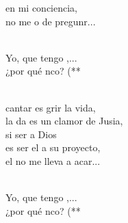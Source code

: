 \begin{cancion}
en mi conciencia, \\
	no me o de pregunr...\\\jump\\
	\begin{chorus}%
	Yo, que tengo ,...  \\
	¿por qué nco? (** \\
	\end{chorus}%
	\jump\\
	cantar es grir la vida,\\
	la da es un clamor de Jusia,\\
	si ser a Dios \\
	es ser el a su proyecto,\\
	el no me lleva a acar...\\\jump\\
	\begin{chorus}%
	Yo, que tengo ,...  \\
	¿por qué nco? (** \\
	\end{chorus}%
	\jump\\
\end{cancion}%
